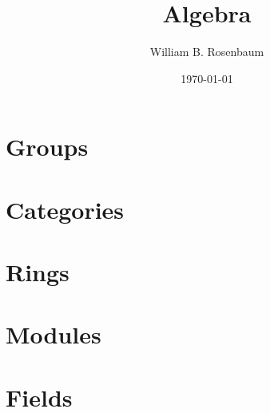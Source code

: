 \documentclass{memoir}
\title{Algebra}
\author{William B. Rosenbaum}
\date{\today}
\begin{document}
\maketitle

\chapter{Groups}


\chapter{Categories}

\chapter{Rings}



\chapter{Modules}



\chapter{Fields}



\end{document}
